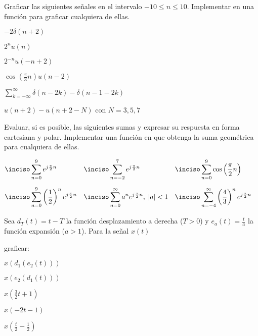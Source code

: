 
\begin{ejercicio}
Graficar las siguientes señales en el intervalo $-10 \leq n \leq 10$. Implementar en \Keyboardsym una función para graficar cualquiera de ellas.

\inciso $-2\delta(n+2)$

\inciso $2^n u(n)$

\inciso $2^{-n} u(-n+2)$

\inciso $\cos\left(\frac{\pi}{3} n \right) u(n-2)$

\inciso $\sum_{k=-\infty}^{\infty} \delta(n-2k) - \delta(n-1-2k)$

\inciso $u(n+2) - u(n+2-N)$ con $N=3,5,7$


\end{ejercicio}

\begin{ejercicio}
Evaluar, si es posible, las siguientes sumas y expresar su respuesta en forma cartesiana y polar. Implementar una función en \Keyboardsym que obtenga la suma geométrica para cualquiera de ellas. 

\begin{align*}
\inciso & \sum_{n=0}^9 e^{j\frac{\pi}{2}n} &
\inciso & \sum_{n=-2}^7 e^{j\frac{\pi}{2}n} & \inciso & \sum_{n=0}^9 \cos\left(\frac{\pi}{2}n\right) & \hfill \\[.5em]
\inciso & \sum_{n=0}^9 \left(\frac{1}{2}\right)^n e^{j\frac{\pi}{2}n} & 
\inciso & \sum_{n=0}^\infty a^n e^{j\frac{\pi}{2}n},\; |a| < 1 & 
\inciso & \sum_{n=-4}^\infty \left(\frac{4}{3}\right)^n e^{j\frac{\pi}{2}n}
\end{align*}
\end{ejercicio}

\begin{ejercicio}
Sea $d_T(t)=t-T$ la función desplazamiento a derecha ($T>0$) y $e_a(t)=\frac{t}{a}$ la función expansión ($a > 1$). Para la señal $x(t)$

\begin{center}
    
\end{center}

graficar:

\inciso $x(d_1(e_2(t)))$

\inciso $x(e_2(d_1(t)))$

\inciso $x\left(\frac{3}{2}t + 1\right)$

\inciso $x\left(-2t -1\right)$

\inciso $x\left(\frac{t}{2} - \frac{1}{2} \right)$

\end{ejercicio}

